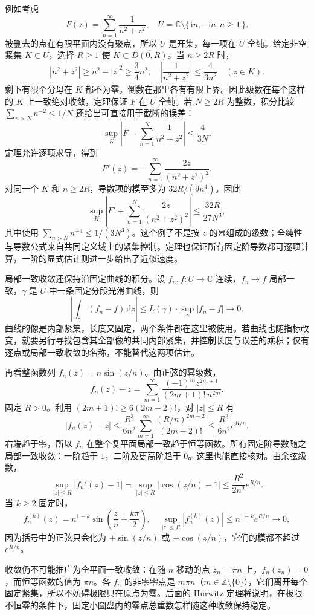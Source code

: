 例如考虑
\[
 F(z)=\sum_{n=1}^\infty\frac1{n^2+z^2},
 \quad U=\mathbb C\setminus\{\,\mathrm{i}n,-\mathrm{i}n:n\ge1\,\}.
\]
被删去的点在有限平面内没有聚点，所以 \(U\) 是开集，每一项在 \(U\) 全纯。给定非空紧集 \(K\subset U\)，选择 \(R\ge1\) 使 \(K\subset\overline{D(0,R)}\)。当 \(n\ge2R\) 时，
\[
 |n^2+z^2|\ge n^2-|z|^2\ge\frac34n^2,
 \quad \left|\frac1{n^2+z^2}\right|\le\frac4{3n^2}
 \quad(z\in K).
\]
剩下有限个分母在 \(K\) 都不为零，倒数在那里各有有限上界。因此级数在每个这样的 \(K\) 上一致绝对收敛，定理保证 \(F\) 在 \(U\) 全纯。若 \(N\ge2R\) 为整数，积分比较 \(\sum_{n>N}n^{-2}\le1/N\) 还给出可直接用于截断的误差：
\[
 \sup_K\left|F-\sum_{n=1}^N\frac1{n^2+z^2}\right|
 \le\frac4{3N}.
\]
定理允许逐项求导，得到
\[
 F'(z)=-\sum_{n=1}^\infty\frac{2z}{(n^2+z^2)^2}.
\]
对同一个 \(K\) 和 \(n\ge2R\)，导数项的模至多为 \(32R/(9n^4)\)。因此
\[
 \sup_K\left|F'+\sum_{n=1}^N\frac{2z}{(n^2+z^2)^2}\right|
 \le\frac{32R}{27N^3},
\]
其中使用 \(\sum_{n>N}n^{-4}\le1/(3N^3)\)。这个例子不是按 \(z\) 的幂组成的级数；全纯性与导数公式来自共同定义域上的紧集控制。定理也保证所有固定阶导数都可逐项计算，一阶的显式估计则进一步给出了近似速度。

\ProseParagraphBreak

局部一致收敛还保持沿固定曲线的积分。设 \(f_n,f:U\to\mathbb C\) 连续，\(f_n\to f\) 局部一致，\(\gamma\) 是 \(U\) 中一条固定分段光滑曲线，则
\[
 \left|\int_\gamma(f_n-f)\,\mathrm{d}z\right|
 \le L(\gamma)\cdot\sup_{\gamma}|f_n-f|\longrightarrow0.
\]
曲线的像是内部紧集，长度又固定，两个条件都在这里被使用。若曲线也随指标改变，就要另行寻找包含其全部像的共同内部紧集，并控制长度与误差的乘积；仅有逐点或局部一致收敛的名称，不能替代这两项估计。

\ProseParagraphBreak

再看整函数列 \(f_n(z)=n\sin(z/n)\)。由正弦的幂级数，
\[
 f_n(z)-z=\sum_{m=1}^\infty
       \frac{(-1)^mz^{2m+1}}{(2m+1)!\,n^{2m}}.
\]
固定 \(R>0\)。利用 \((2m+1)!\ge6(2m-2)!\)，对 \(|z|\le R\) 有
\[
 |f_n(z)-z|
 \le\frac{R^3}{6n^2}
       \sum_{m=1}^\infty\frac{(R/n)^{2m-2}}{(2m-2)!}
 \le\frac{R^3}{6n^2}e^{R/n}.
\]
右端趋于零，所以 \(f_n\) 在整个复平面局部一致趋于恒等函数。所有固定阶导数随之局部一致收敛：一阶趋于 \(1\)，二阶及更高阶趋于 \(0\)。这里也能直接核对。由余弦级数，
\[
 \sup_{|z|\le R}|f_n'(z)-1|
 =\sup_{|z|\le R}|\cos(z/n)-1|
 \le\frac{R^2}{2n^2}e^{R/n}.
\]
当 \(k\ge2\) 固定时，
\[
 f_n^{(k)}(z)=n^{1-k}\sin\left(\frac zn+\frac{k\pi}2\right),
 \quad
 \sup_{|z|\le R}|f_n^{(k)}(z)|\le n^{1-k}e^{R/n}\longrightarrow0,
\]
因为括号中的正弦只会化为 \(\pm\sin(z/n)\) 或 \(\pm\cos(z/n)\)，它们的模都不超过 \(e^{R/n}\)。

\ProseParagraphBreak

收敛仍不可能推广为全平面一致收敛：在随 \(n\) 移动的点 \(z_n=\pi n\) 上，\(f_n(z_n)=0\)，而恒等函数的值为 \(\pi n\)。各 \(f_n\) 的非零零点是 \(m\pi n\)（\(m\in\mathbb Z\setminus\{0\}\)），它们离开每个固定紧集，所以不妨碍极限只在原点为零。后面的 Hurwitz 定理将说明，在极限不恒零的条件下，固定小圆盘内的零点总重数怎样随这种收敛保持稳定。
